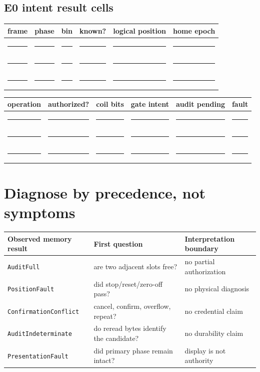 \documentclass[10pt]{article}
\newcommand{\blankline}{\rule{0.72in}{0.4pt}}
\begin{document}
\subsection*{E0 intent result cells}
\begin{tabularx}{\linewidth}{@{}X X X X X X@{}}
\toprule
frame & phase & bin & known? & logical position & home epoch\\
\midrule
\rule{0pt}{16pt}\blankline & \blankline & \blankline & \blankline & \blankline & \blankline\\[9pt]
\blankline & \blankline & \blankline & \blankline & \blankline & \blankline\\[9pt]
\blankline & \blankline & \blankline & \blankline & \blankline & \blankline\\
\bottomrule
\end{tabularx}

\begin{tabularx}{\linewidth}{@{}X X X X X X@{}}
\toprule
operation & authorized? & coil bits & gate intent & audit pending & fault\\
\midrule
\rule{0pt}{16pt}\blankline & \blankline & \blankline & \blankline & \blankline & \blankline\\[9pt]
\blankline & \blankline & \blankline & \blankline & \blankline & \blankline\\[9pt]
\blankline & \blankline & \blankline & \blankline & \blankline & \blankline\\
\bottomrule
\end{tabularx}

\section{Diagnose by precedence, not symptoms}
\begin{tabularx}{\linewidth}{@{}l X X@{}}
\toprule
Observed memory result & First question & Interpretation boundary\\
\midrule
\texttt{AuditFull} & are two adjacent slots free? & no partial authorization\\
\texttt{PositionFault} & did stop/reset/zero-off pass? & no physical diagnosis\\
\texttt{ConfirmationConflict} & cancel, confirm, overflow, repeat? & no credential claim\\
\texttt{AuditIndeterminate} & do reread bytes identify the candidate? & no durability claim\\
\texttt{PresentationFault} & did primary phase remain intact? & display is not authority\\
\bottomrule
\end{tabularx}
\end{document}

